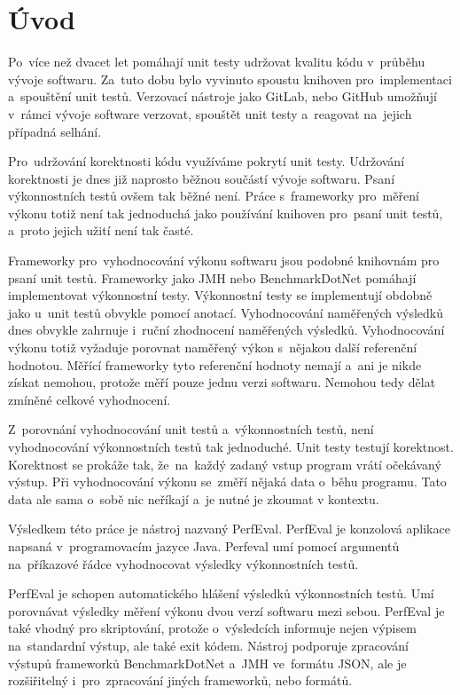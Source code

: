 \chapter*{Úvod}
Po~více než dvacet let pomáhají unit testy udržovat kvalitu kódu v~průběhu vývoje
softwaru. Za~tuto dobu bylo vyvinuto spoustu knihoven pro~implementaci a~spouštění
unit testů. Verzovací nástroje jako GitLab, nebo GitHub umožňují v~rámci vývoje
software verzovat, spouštět unit testy a~reagovat na~jejich případná selhání.

Pro~udržování korektnosti kódu využíváme pokrytí unit testy. Udržování korektnosti
je dnes již naprosto běžnou součástí vývoje softwaru. Psaní výkonnostních testů ovšem
tak běžné není. Práce s~frameworky pro~měření výkonu totiž není tak jednoduchá jako používání
knihoven pro~psaní unit testů, a~proto jejich užití není tak časté.

Frameworky pro~vyhodnocování výkonu softwaru jsou podobné knihovnám pro psaní unit testů.
Frameworky jako JMH nebo BenchmarkDotNet pomáhají implementovat výkonnostní testy.
Výkonnostní testy se implementují obdobně jako u~unit testů obvykle pomocí anotací.
Vyhodnocování naměřených výsledků dnes obvykle zahrnuje i~ruční zhodnocení naměřených výsledků.
Vyhodnocování výkonu totiž vyžaduje porovnat naměřený výkon s~nějakou další referenční hodnotou.
Měřící frameworky tyto referenční hodnoty nemají a~ani je nikde získat nemohou,
protože měří pouze jednu verzi softwaru. Nemohou tedy dělat zmíněné celkové vyhodnocení.

Z~porovnání vyhodnocování unit testů a~výkonnostních testů, není vyhodnocování
výkonnostních testů tak jednoduché. Unit testy testují korektnost. Korektnost
se prokáže tak, že~na~každý zadaný vstup program vrátí očekávaný výstup. Při vyhodnocování
výkonu se~změří nějaká data o~běhu programu. Tato data ale sama o~sobě nic neříkají
a~je nutné je zkoumat v kontextu.

Výsledkem této práce je nástroj nazvaný PerfEval. PerfEval je konzolová aplikace
napsaná v~programovacím jazyce Java. Perfeval umí pomocí argumentů na~příkazové
řádce vyhodnocovat výsledky výkonnostních testů.

PerfEval je schopen automatického hlášení výsledků výkonnostních testů. Umí porovnávat
výsledky měření výkonu dvou verzí softwaru mezi sebou. PerfEval je také vhodný pro
skriptování, protože o~výsledcích informuje nejen výpisem na~standardní výstup, ale
také exit kódem. Nástroj podporuje zpracování výstupů frameworků BenchmarkDotNet a~JMH ve~formátu JSON,
ale je rozšiřitelný i~pro~zpracování jiných frameworků, nebo formátů.
